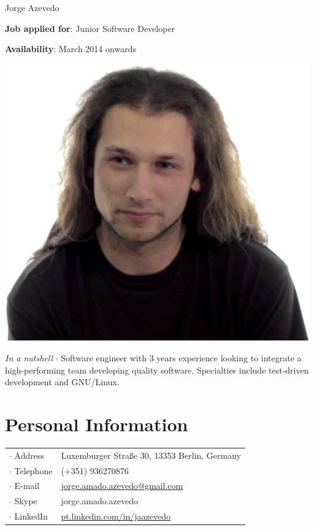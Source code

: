 



\topSection
{
	{\Huge Jorge Azevedo}

	\vspace{1.5mm}
	\vspace*{10mm}

	\textbf{Job applied for}: Junior Software Developer

	\textbf{Availability}: March 2014 onwards
} {
	\includegraphics[width=0.985\textwidth]{img/photo}
}

\emph{In a nutshell} $\cdot$ Software engineer with 3 years experience looking
to integrate a high-performing team developing quality software. Specialties
include test-driven development and GNU/Linux.

\section*{Personal Information}

{
\begin{tabular}[t]{@{}l l}
	$\cdot$  Address & Luxemburger Straße 30, 13353 Berlin, Germany \\
	$\cdot$  Telephone & (+351) 936270876 \\
	$\cdot$  E-mail & \href{mailto:jorge.amado.azevedo@gmail.com}{jorge.amado.azevedo@gmail.com} \\
	$\cdot$  Skype & jorge.amado.azevedo\\
	$\cdot$  LinkedIn & \href{http://pt.linkedin.com/in/jaazevedo}{pt.linkedin.com/in/jaazevedo}\\
\end{tabular}
}

